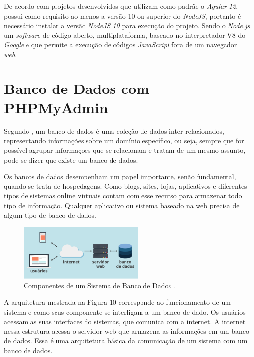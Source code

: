     De acordo com  projetos desenvolvidos que utilizam como padrão o \textit{Agular 12}, possui como requisito ao menos a versão 10 ou superior do \textit{NodeJS}, portanto é necessário instalar a versão \textit{NodeJS 10} para execução do projeto. Sendo o \textit{Node.js} um \textit{software} de código aberto, multiplataforma, baseado no interpretador V8 do \textit{Google} e que permite a execução de códigos \textit{JavaScript} fora de um navegador \textit{web}.
   

\section{Banco de Dados com PHPMyAdmin}
    Segundo , um banco de dados é uma coleção de dados inter-relacionados, representando informações sobre um domínio específico, ou seja, sempre que for possível agrupar informações que se relacionam e tratam de um mesmo assunto, pode-se dizer que existe um banco de dados.
    
    Os bancos de dados desempenham um papel importante, senão fundamental, quando se trata de hospedagens. Como blogs, sites, lojas, aplicativos e diferentes tipos de sistemas online virtuais contam com esse recurso para armazenar todo tipo de informação. Qualquer aplicativo ou sistema baseado na web precisa de algum tipo de banco de dados. 
    
    \begin{figure}[h]
    \centering
    \includegraphics[width=0.55\textwidth]{./img/BancoDados.png}
    \caption{Componentes de um Sistema de Banco de Dados .}
    \label{fig:BancoDados}
    \end{figure}

    A arquitetura mostrada na Figura 10 corresponde ao funcionamento de um sistema e como seus componente se interligam a um banco de dado. Os usuários acessam as suas interfaces do sistemas, que comunica com a internet. A internet nessa estrutura acessa o servidor web que armazena as informações em um banco de dados. Essa é uma arquitetura básica da comunicação de um sistema com um banco de dados.
    
